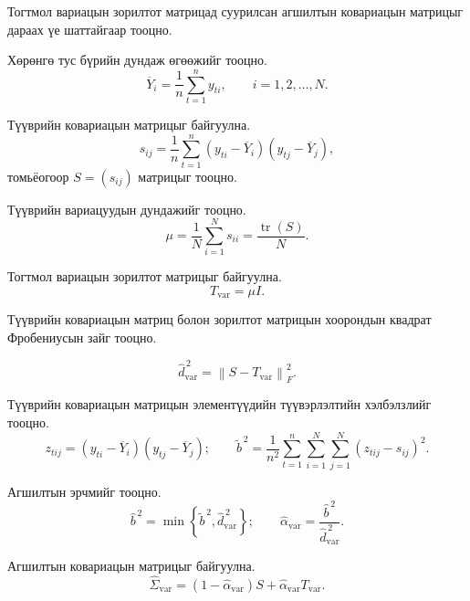 Тогтмол вариацын зорилтот матрицад суурилсан агшилтын ковариацын матрицыг дараах үе шаттайгаар тооцно.
\begin{enumerate}
	\item Хөрөнгө тус бүрийн дундаж өгөөжийг тооцно.
	\[
	\overline{Y}_i
	=
	\frac{1}{n}
	\sum_{t=1}^{n}y_{ti},
	\qquad
	i=1,2,\ldots,N.
	\]
	\item {Түүврийн ковариацын матрицыг байгуулна.
	\[
	s_{ij}
	=
	\frac{1}{n}
	\sum_{t=1}^{n}
	(y_{ti}-\overline{Y}_i)
	(y_{tj}-\overline{Y}_j),
	\]
	томьёогоор $S=(s_{ij})$ матрицыг тооцно.
	\item Түүврийн вариацуудын дундажийг тооцно.
	\[
	\mu
	=
	\frac{1}{N}
	\sum_{i=1}^{N}s_{ii}
	=
	\frac{\operatorname{tr}(S)}{N}.
	\]
	\item Тогтмол вариацын зорилтот матрицыг байгуулна.
	\[
	T_{\mathrm{var}}
	=
	\mu I.
	\]
	\item Түүврийн ковариацын матриц болон зорилтот матрицын хоорондын квадрат Фробениусын зайг тооцно.}
	\[
	\widehat{d}_{\mathrm{var}}^{\,2}
	=
	\left\|
	S-T_{\mathrm{var}}
	\right\|_F^2.
	\]
	\item Түүврийн ковариацын матрицын элементүүдийн
	түүвэрлэлтийн хэлбэлзлийг тооцно.	
	\[
	z_{tij}
	=
	(y_{ti}-\overline{Y}_i)
	(y_{tj}-\overline{Y}_j);\qquad 
	\widetilde{b}^{\,2}
	=
	\frac{1}{n^2}
	\sum_{t=1}^{n}
	\sum_{i=1}^{N}
	\sum_{j=1}^{N}
	(z_{tij}-s_{ij})^2.
	\]
	\item Агшилтын эрчмийг тооцно.
	\[
	\widehat{b}^{\,2}
	=
	\min
	\left\{
	\widetilde{b}^{\,2},
	\widehat{d}_{\mathrm{var}}^{\,2}
	\right\}; \qquad 
	\widehat{\alpha}_{\mathrm{var}}
	=
	\frac{\widehat{b}^{\,2}}
	{\widehat{d}_{\mathrm{var}}^{\,2}}.
	\]
	\item Агшилтын ковариацын матрицыг байгуулна.	
	\[
	\widehat{\Sigma}_{\mathrm{var}}
	=
	(1-\widehat{\alpha}_{\mathrm{var}})S
	+
	\widehat{\alpha}_{\mathrm{var}}T_{\mathrm{var}}.
	\]
\end{enumerate}